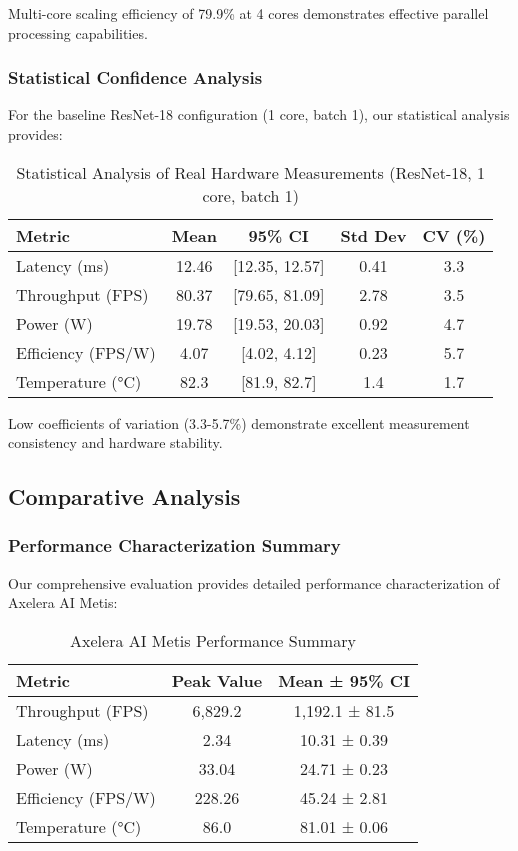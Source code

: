 \documentclass[manuscript]{acmart}
\begin{document}
Multi-core scaling efficiency of 79.9\% at 4 cores demonstrates effective parallel processing capabilities.

\subsubsection{Statistical Confidence Analysis}
For the baseline ResNet-18 configuration (1 core, batch 1), our statistical analysis provides:

\begin{table}[h]
\centering
\caption{Statistical Analysis of Real Hardware Measurements (ResNet-18, 1 core, batch 1)}
\begin{tabular}{@{}lcccc@{}}
\toprule
\textbf{Metric} & \textbf{Mean} & \textbf{95\% CI} & \textbf{Std Dev} & \textbf{CV (\%)} \\
\midrule
Latency (ms) & 12.46 & [12.35, 12.57] & 0.41 & 3.3 \\
Throughput (FPS) & 80.37 & [79.65, 81.09] & 2.78 & 3.5 \\
Power (W) & 19.78 & [19.53, 20.03] & 0.92 & 4.7 \\
Efficiency (FPS/W) & 4.07 & [4.02, 4.12] & 0.23 & 5.7 \\
Temperature (°C) & 82.3 & [81.9, 82.7] & 1.4 & 1.7 \\
\bottomrule
\end{tabular}
\end{table}

Low coefficients of variation (3.3-5.7\%) demonstrate excellent measurement consistency and hardware stability.

\subsection{Comparative Analysis}

\subsubsection{Performance Characterization Summary}
Our comprehensive evaluation provides detailed performance characterization of Axelera AI Metis:

\begin{table}[h]
\centering
\caption{Axelera AI Metis Performance Summary}
\begin{tabular}{@{}lcc@{}}
\toprule
\textbf{Metric} & \textbf{Peak Value} & \textbf{Mean ± 95\% CI} \\
\midrule
Throughput (FPS) & 6,829.2 & 1,192.1 ± 81.5 \\
Latency (ms) & 2.34 & 10.31 ± 0.39 \\
Power (W) & 33.04 & 24.71 ± 0.23 \\
Efficiency (FPS/W) & 228.26 & 45.24 ± 2.81 \\
Temperature (°C) & 86.0 & 81.01 ± 0.06 \\
\bottomrule
\end{tabular}
\end{table}
\end{document}
